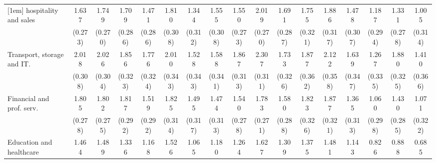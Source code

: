 {\begin{tabular}{l*{16}{c}}
[1em]
hospitality and sales&       1.637\sym{***}&       1.749\sym{***}&       1.709\sym{***}&       1.471\sym{***}&       1.810\sym{***}&       1.344\sym{***}&       1.555\sym{***}&       1.550\sym{***}&       2.019\sym{***}&       1.691\sym{***}&       1.755\sym{***}&       1.886\sym{***}&       1.478\sym{***}&       1.187\sym{***}&       1.331\sym{***}&       1.005\sym{**} \\
                    &     (0.273)         &     (0.270)         &     (0.286)         &     (0.286)         &     (0.308)         &     (0.312)         &     (0.308)         &     (0.273)         &     (0.270)         &     (0.287)         &     (0.321)         &     (0.317)         &     (0.307)         &     (0.294)         &     (0.278)         &     (0.314)         \\
[1em]
Transport, storage and IT.&       2.018\sym{***}&       2.026\sym{***}&       1.856\sym{***}&       1.776\sym{***}&       2.010\sym{***}&       1.528\sym{***}&       1.588\sym{***}&       1.867\sym{***}&       2.307\sym{***}&       1.733\sym{***}&       1.877\sym{***}&       2.122\sym{***}&       1.639\sym{***}&       1.267\sym{***}&       1.880\sym{***}&       1.410\sym{***}\\
                    &     (0.308)         &     (0.304)         &     (0.323)         &     (0.324)         &     (0.343)         &     (0.343)         &     (0.341)         &     (0.313)         &     (0.311)         &     (0.326)         &     (0.362)         &     (0.358)         &     (0.347)         &     (0.335)         &     (0.325)         &     (0.366)         \\
[1em]
Financial and prof. serv.&       1.805\sym{***}&       1.802\sym{***}&       1.817\sym{***}&       1.519\sym{***}&       1.825\sym{***}&       1.495\sym{***}&       1.474\sym{***}&       1.540\sym{***}&       1.783\sym{***}&       1.580\sym{***}&       1.823\sym{***}&       1.877\sym{***}&       1.365\sym{***}&       1.060\sym{***}&       1.430\sym{***}&       1.071\sym{***}\\
                    &     (0.278)         &     (0.275)         &     (0.292)         &     (0.292)         &     (0.314)         &     (0.317)         &     (0.313)         &     (0.278)         &     (0.271)         &     (0.288)         &     (0.326)         &     (0.321)         &     (0.313)         &     (0.298)         &     (0.285)         &     (0.322)         \\
[1em]
Education and healthcare&       1.464\sym{***}&       1.489\sym{***}&       1.336\sym{***}&       1.168\sym{***}&       1.526\sym{***}&       1.065\sym{***}&       1.180\sym{***}&       1.264\sym{***}&       1.627\sym{***}&       1.309\sym{***}&       1.375\sym{***}&       1.481\sym{***}&       1.143\sym{***}&       0.826\sym{**} &       0.888\sym{**} &       0.685\sym{*}  \\

\end{tabular}}
